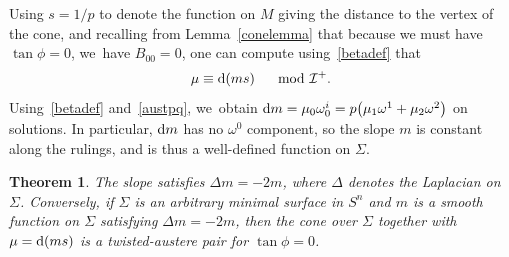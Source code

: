 \documentclass[10pt,a4paper]{amsart}
\def\calI{\mathcal{I}}
\def\w{\omega}
\newtheorem{Theorem}{Theorem}[section]
\numberwithin{equation}{section}
\begin{document}
Using $s=1/p$ to denote the function on $M$ giving the distance to the vertex of the cone, and recalling from Lemma~\ref{conelemma} that because we must have $\tan \phi = 0$, we~have $B_{00} = 0$, one can compute using~\eqref{betadef} that
\begin{gather*}
\mu \equiv {\rm d}(ms) \quad \mod \calI^+.
\end{gather*}
Using~\eqref{betadef} and~\eqref{austpq}, we~obtain ${\rm d}m = \mu_0 \w^i_0 = p\big(\mu_1 \omega^1 + \mu_2 \omega^2\big)$ on solutions. In particular, ${\rm d}m$ has no $\w^0$ component, so the slope $m$ is constant along the rulings, and is thus a well-defined function on $\Sigma$.

\begin{Theorem}
The slope satisfies $\Delta m =-2m$, where $\Delta$ denotes the Laplacian on $\Sigma$. Conversely, if $\Sigma$ is an arbitrary minimal surface in $S^n$ and $m$ is a smooth function on $\Sigma$ satisfying $\Delta m = -2m$, then the cone over $\Sigma$ together with $\mu = {\rm d}(ms)$ is a twisted-austere pair for $\tan\phi=0$.
\end{Theorem}
\end{document}
